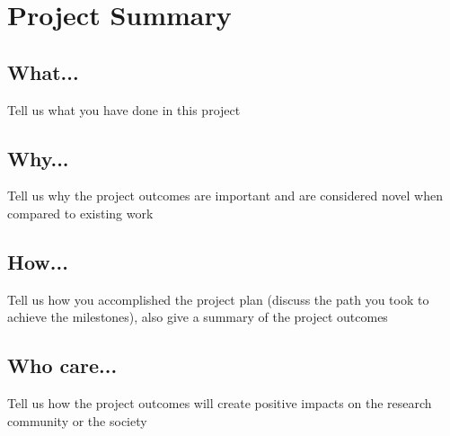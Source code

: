 \section*{Project Summary}

\subsection{What...}
Tell us what you have done in this project

\subsection{Why...}
Tell us why the project outcomes are important and are considered novel when compared to existing work

\subsection{How...}
Tell us how you accomplished the project plan (discuss the path you took to achieve the milestones), also give a summary of the project outcomes

\subsection{Who care...}
Tell us how the project outcomes will create positive impacts on the research community or the society
